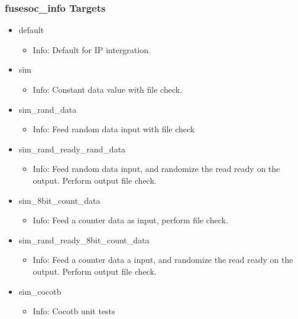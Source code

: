 \subsubsection{fusesoc\_info Targets}
\begin{itemize}
\item default
	\begin{itemize}
	\item[$\space$] Info: Default for IP intergration.
	\end{itemize}
\item sim
	\begin{itemize}
	\item[$\space$] Info: Constant data value with file check.
	\end{itemize}
\item sim\_rand\_data
	\begin{itemize}
	\item[$\space$] Info: Feed random data input with file check
	\end{itemize}
\item sim\_rand\_ready\_rand\_data
	\begin{itemize}
	\item[$\space$] Info: Feed random data input, and randomize the read ready on the output. Perform output file check.
	\end{itemize}
\item sim\_8bit\_count\_data
	\begin{itemize}
	\item[$\space$] Info: Feed a counter data as input, perform file check.
	\end{itemize}
\item sim\_rand\_ready\_8bit\_count\_data
	\begin{itemize}
	\item[$\space$] Info: Feed a counter data a input, and randomize the read ready on the output. Perform output file check.
	\end{itemize}
\item sim\_cocotb
	\begin{itemize}
	\item[$\space$] Info: Cocotb unit tests
	\end{itemize}
\end{itemize}
